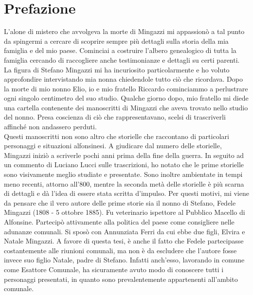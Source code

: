 \thispagestyle{empty}
\chapter*{Prefazione}
L'alone di mistero che avvolgeva la morte di Mingazzi mi appassionò a tal punto da spingermi a cercare di scoprire sempre più dettagli sulla storia della mia famiglia e del mio paese. Cominciai a costruire l'albero genealogico di tutta la famiglia cercando di raccogliere anche testimonianze e dettagli su certi parenti. La figura di Stefano Mingazzi mi ha incuriosito particolarmente e ho voluto approfondire intervistando mia nonna chiedendole tutto ciò che ricordava. Dopo la morte di mio nonno Elio, io e mio fratello Riccardo cominciammo a perlustrare ogni singolo centimetro del suo studio. Qualche giorno dopo, mio fratello mi diede una cartella contenente dei manoscritti di Mingazzi che aveva trovato nello studio del nonno. Presa coscienza di ciò che rappresentavano, scelsi di trascriverli affinché non andassero perduti.\\
\indent Questi manoscritti non sono altro che storielle che raccontano di particolari personaggi e situazioni alfonsinesi. A giudicare dal numero delle storielle, Mingazzi iniziò a scriverle pochi anni prima della fine della guerra. 
In seguito ad un commento di Luciano Lucci sulle trascrizioni, ho notato che le prime storielle sono visivamente meglio studiate e presentate. Sono inoltre ambientate in tempi meno recenti, attorno all'800, mentre la seconda metà delle storielle è più scarna di dettagli e dà l'idea di essere stata scritta d'impulso. Per questi motivi, mi viene da pensare che il vero autore delle prime storie sia il nonno di Stefano, Fedele Mingazzi (1808 - 5 ottobre 1885). Fu veterinario ispettore al Pubblico Macello di Alfonsine. Partecipò attivamente alla politica del paese come consigliere nelle adunanze comunali. Si sposò con Annunziata Ferri da cui ebbe due figli, Elvira e Natale Mingazzi. A favore di questa tesi, è anche il fatto che Fedele partecipasse costantemente alle riunioni comunali, ma non è da escludere che l'autore fosse invece suo figlio Natale, padre di Stefano. Infatti anch'esso, lavorando in comune come Esattore Comunale, ha sicuramente avuto modo di conoscere tutti i personaggi presentati, in quanto sono prevalentemente appartenenti all'ambito comunale.\\

